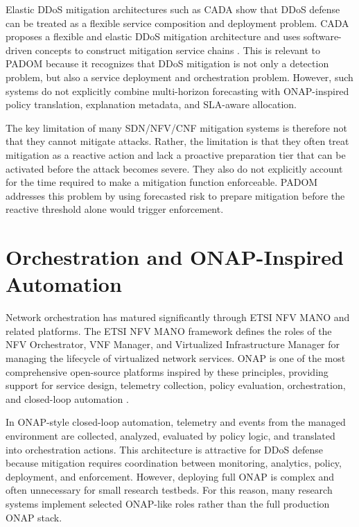 \documentclass[12pt, a4paper, reqno, oneside]{book}
\newcommand{\padonap}{\textsc{PADOM}}
\begin{document}
Elastic DDoS mitigation architectures such as CADA show that DDoS defense can
be treated as a flexible service composition and deployment problem. CADA
proposes a flexible and elastic DDoS mitigation architecture and uses
software-driven concepts to construct mitigation service chains
\cite{cada_2025}. This is relevant to \padonap{} because it recognizes that
DDoS mitigation is not only a detection problem, but also a service deployment
and orchestration problem. However, such systems do not explicitly combine
multi-horizon forecasting with ONAP-inspired policy translation, explanation
metadata, and SLA-aware allocation.

The key limitation of many SDN/NFV/CNF mitigation systems is therefore not
that they cannot mitigate attacks. Rather, the limitation is that they often
treat mitigation as a reactive action and lack a proactive preparation tier
that can be activated before the attack becomes severe. They also do not
explicitly account for the time required to make a mitigation function
enforceable. \padonap{} addresses this problem by using forecasted risk to
prepare mitigation before the reactive threshold alone would trigger
enforcement.

\section{ Orchestration and ONAP-Inspired Automation}
\label{sec:related-orchestration}

Network orchestration has matured significantly through ETSI NFV MANO and
related platforms. The ETSI NFV MANO framework defines the roles of the NFV
Orchestrator, VNF Manager, and Virtualized Infrastructure Manager for managing
the lifecycle of virtualized network services. ONAP is one of the most
comprehensive open-source platforms inspired by these principles, providing
support for service design, telemetry collection, policy evaluation,
orchestration, and closed-loop automation \cite{onap_docs}.

In ONAP-style closed-loop automation, telemetry and events from the managed
environment are collected, analyzed, evaluated by policy logic, and translated
into orchestration actions. This architecture is attractive for DDoS defense
because mitigation requires coordination between monitoring, analytics, policy,
deployment, and enforcement. However, deploying full ONAP is complex and often
unnecessary for small research testbeds. For this reason, many research systems
implement selected ONAP-like roles rather than the full production ONAP stack.
\end{document}
